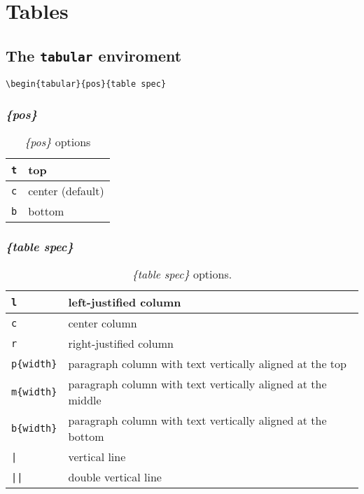 \documentclass[11pt,a4paper]{article}
\begin{document}
\tableofcontents
\listoftables
\pagebreak


\section{Tables}
\subsection[\texttt{tabular}]{The \texttt{tabular} enviroment}
\begin{verbatim}
\begin{tabular}{pos}{table spec}
\end{verbatim}

\subsubsection{\emph{\{pos\}}}
\begin{table}[htbp]
	\centering
\begin{center}
	\begin{tabular}{| c | p{3cm} |}
		\hline
		\texttt{t} & top \\ \hline
		\texttt{c} & center (default) \\ \hline
		\texttt{b} & bottom \\ \hline
	\end{tabular}
\end{center}
	\caption{\emph{\{pos\}} options}
	\label{tabular_positions}
\end{table}
\subsubsection{\emph{\{table spec\}}}

\begin{table}[htbp]
	\centering
	\begin{tabular}{| l | p{10cm} |}
	\hline
	\texttt{l} & left-justified column \\ \hline
	\texttt{c} & center column \\ \hline
	\texttt{r} & right-justified column \\ \hline
	\verb|p{width}| & paragraph column with text vertically aligned at the top \\ \hline
	\verb|m{width}| & paragraph column with text vertically aligned at the middle \\ \hline
	\verb|b{width}| & paragraph column with text vertically aligned at the bottom \\ \hline
	\texttt{|} & vertical line \\ \hline
	\texttt{||} & double vertical line \\
	\hline
	\end{tabular}
	\caption{\emph{\{table spec\}} options.}
	\label{tabular_specs}
\end{table}
\end{document}
